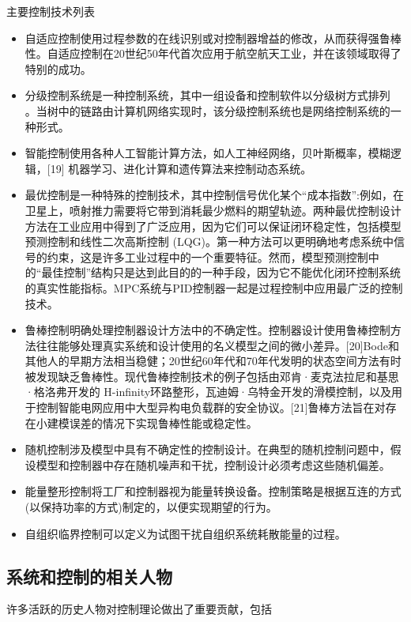主要控制技术列表

\begin{itemize}
\item 自适应控制使用过程参数的在线识别或对控制器增益的修改，从而获得强鲁棒性。自适应控制在20世纪50年代首次应用于航空航天工业，并在该领域取得了特别的成功。
\item 分级控制系统是一种控制系统，其中一组设备和控制软件以分级树方式排列 。当树中的链路由计算机网络实现时，该分级控制系统也是网络控制系统的一种形式。
\item 智能控制使用各种人工智能计算方法，如人工神经网络，贝叶斯概率，模糊逻辑，[19] 机器学习、进化计算和遗传算法来控制动态系统。
\item 最优控制是一种特殊的控制技术，其中控制信号优化某个“成本指数”:例如，在卫星上，喷射推力需要将它带到消耗最少燃料的期望轨迹。两种最优控制设计方法在工业应用中得到了广泛应用，因为它们可以保证闭环稳定性，包括模型预测控制和线性二次高斯控制 (LQG)。第一种方法可以更明确地考虑系统中信号的约束，这是许多工业过程中的一个重要特征。然而，模型预测控制中的“最佳控制”结构只是达到此目的的一种手段，因为它不能优化闭环控制系统的真实性能指标。MPC系统与PID控制器一起是过程控制中应用最广泛的控制技术。
\item 鲁棒控制明确处理控制器设计方法中的不确定性。控制器设计使用鲁棒控制方法往往能够处理真实系统和设计使用的名义模型之间的微小差异。[20]Bode和其他人的早期方法相当稳健；20世纪60年代和70年代发明的状态空间方法有时被发现缺乏鲁棒性。现代鲁棒控制技术的例子包括由邓肯·麦克法拉尼和基思·格洛弗开发的 H-infinity环路整形，瓦迪姆·乌特金开发的滑模控制，以及用于控制智能电网应用中大型异构电负载群的安全协议。[21]鲁棒方法旨在对存在小建模误差的情况下实现鲁棒性能或稳定性。
\item 随机控制涉及模型中具有不确定性的控制设计。在典型的随机控制问题中，假设模型和控制器中存在随机噪声和干扰，控制设计必须考虑这些随机偏差。
\item 能量整形控制将工厂和控制器视为能量转换设备。控制策略是根据互连的方式(以保持功率的方式)制定的，以便实现期望的行为。
\item 自组织临界控制可以定义为试图干扰自组织系统耗散能量的过程。
\end{itemize}


\subsection{系统和控制的相关人物}

许多活跃的历史人物对控制理论做出了重要贡献，包括

